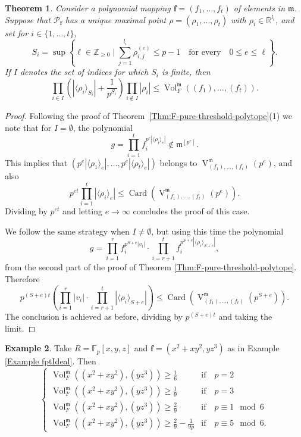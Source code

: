 \documentclass[12pt]{amsart}
\newtheorem{theorem}{Theorem}[section]
\theoremstyle{definition}
\newtheorem{example}[theorem]{Example}
\numberwithin{equation}{subsection}
\newcommand{\FF}{\mathbb{F}}
\newcommand{\RR}{\mathbb{R}}
\newcommand{\m}{\mathfrak{m}}
\newcommand{\SP}{\mathcal{P}}
\newcommand{\Bf}{\boldsymbol{f}}
\newcommand{\Card}{\operatorname{Card}}
\newcommand{\Vol}{\operatorname{Vol}}
\newcommand{\V}{\operatorname{V}}
\renewcommand{\!}[1]{{\color{red}\text{\Huge$\star$ }#1}}
\begin{document}
\begin{theorem} \label{Thm:volume-polytope}
	Consider a polynomial mapping $\boldsymbol{f}=(f_1,\ldots, f_t)$ of elements in $\m$. Suppose that $\SP_{\Bf}$ has a unique maximal point $\rho=(\rho_1, \ldots, \rho_t)$ with $\rho_i \in \RR^{l_i}$, and set for $i\in\{1,\ldots,t\}$,
	$$S_i=\sup \left\{\ell\in\mathbb{Z}_{\geq 0} \mid \sum_{j=1}^{l_i} \rho_{i,j}^{(e)}  \leq p-1\quad\text{for every}\quad 0 \leq e \leq \ell  \right\}.$$ 
	If $I$ denotes the set of indices for which $S_i$ is finite,  then
	$$ \prod_{i\in I} \left(|\langle \rho_i \rangle_{S_i}|+\frac{1}{p^{S_i}} \right)  \prod_{i\notin I} |\rho_i|\leq \Vol_F^{\m}((f_1),\ldots,(f_t)).$$ 
\end{theorem}
\begin{proof}
	Following the proof of Theorem~\ref{Thm:F-pure-threshold-polytope}(1) we note that for $I=\emptyset$, the polynomial $$g=\prod_{i=1}^{t} f_i^{p^{e}|\langle \rho_i \rangle_e|} \notin \m^{[p^{e}]}.$$
	This implies that $(p^{e}| \langle \rho_1 \rangle_e|, \ldots, p^{e} |\langle \rho_t \rangle_e |)$ belongs to $ \V_{(f_1),\ldots,(f_t)}^{\m}(p^{e})$, and also $$p^{et}\prod_{i=1}^t | \langle \rho_i \rangle_e| \leq \Card \left( \V_{(f_1),\ldots,(f_t)}^{\m}(p^{e}) \right).$$ Dividing by $p^{et}$ and letting $e \rightarrow \infty$ concludes the proof of this case.
	
	We follow the same strategy when $I \neq \emptyset$, but using this time the polynomial 
	$$g=\prod_{i=1}^{r} f_i^{p^{S+e}|v_i|} \cdot \prod_{i =r+1}^t  f_i^{p^{S+e}|\langle \rho_i \rangle_{S+e}|},$$
	from the second part of the proof of Theorem \ref{Thm:F-pure-threshold-polytope}. Therefore 
	 $$p^{(S+e)t} \left(\prod_{i=1}^r | v_i | \cdot \prod_{i=r+1}^{t} |\langle \rho_i \rangle_{S+e}| \right)  \leq \Card \left( \V_{(f_1),\ldots,(f_t)}^{\m}(p^{S+e}) \right).$$ 
	The conclusion is achieved as before, dividing by $p^{(S+e)t}$ and taking the limit.
\end{proof}
\begin{example}
	Take $R=\FF_p[x,y,z]$ and $\Bf=(x^2+xy^2,yz^3)$ as in Example \ref{Example fptIdeal}. Then 
$$
	\begin{cases}
		 \Vol_F^{\m}((x^2+xy^2),(yz^3)) \geq \frac{1}{6}& \text{if}\quad p=2\\
		\Vol_F^{\m}((x^2+xy^2),(yz^3)) \geq \frac{1}{9}& \text{if}\quad p=3\\
		\Vol_F^{\m}((x^2+xy^2),(yz^3))\geq \frac{2}{9}& \text{if}\quad p\equiv 1 \mod 6 \\
		\Vol_F^{\m}((x^2+xy^2),(yz^3))\geq \frac{2}{9}-\frac{1}{9p}& \text{if}\quad p\equiv 5 \mod 6.
	\end{cases}
	$$ 
\end{example}
\end{document}
